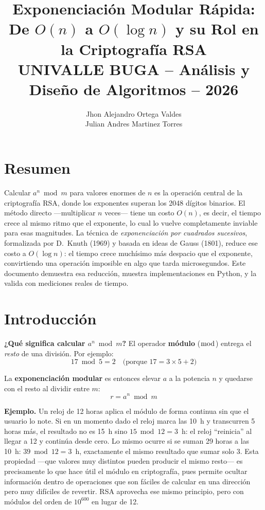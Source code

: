 \documentclass[twocolumn, 10pt]{article}
\title{\textbf{Exponenciación Modular Rápida:\\
De $O(n)$ a $O(\log n)$ y su Rol en la Criptografía RSA}\\[4pt]
\small UNIVALLE BUGA -- Análisis y Diseño de Algoritmos -- 2026}
\author{Jhon Alejandro Ortega Valdes\\ Julian Andres Martinez Torres}
\date{}
\begin{document}
\maketitle

\section*{Resumen}

Calcular $a^n \bmod m$ para valores enormes de $n$ es la operación central
de la criptografía RSA, donde los exponentes superan los 2048 dígitos
binarios. El método directo ---multiplicar $n$ veces--- tiene un costo
$O(n)$, es decir, el tiempo crece al mismo ritmo que el exponente, lo cual
lo vuelve completamente inviable para esas magnitudes. La técnica de
\emph{exponenciación por cuadrados sucesivos}, formalizada por D.\ Knuth
(1969) y basada en ideas de Gauss (1801), reduce ese costo a $O(\log n)$:
el tiempo crece muchísimo más despacio que el exponente, convirtiendo una
operación imposible en algo que tarda microsegundos. Este documento
demuestra esa reducción, muestra implementaciones en Python, y la
valida con mediciones reales de tiempo.

\section{Introducción}

\textbf{¿Qué significa calcular $a^n \bmod m$?} El operador
\textbf{módulo} ($\bmod$) entrega el \emph{resto} de una división. Por
ejemplo:
\[
  17 \bmod 5 = 2 \quad \text{(porque } 17 = 3 \times 5 + 2\text{)}
\]

La \textbf{exponenciación modular} es entonces elevar $a$ a la potencia
$n$ y quedarse con el resto al dividir entre $m$:
\[
  r = a^n \bmod m
\]

\textbf{Ejemplo.} Un reloj de 12 horas aplica el módulo de forma
continua sin que el usuario lo note. Si en un momento dado el reloj
marca las 10~h y transcurren 5 horas más, el resultado no es 15~h
sino $15 \bmod 12 = 3$~h: el reloj ``reinicia'' al llegar a 12 y
continúa desde cero. Lo mismo ocurre si se suman 29 horas a las 10~h:
$39 \bmod 12 = 3$~h, exactamente el mismo resultado que sumar solo 3.
Esta propiedad ---que valores muy distintos pueden producir el mismo
resto--- es precisamente lo que hace útil el módulo en criptografía,
pues permite ocultar información dentro de operaciones que son fáciles
de calcular en una dirección pero muy difíciles de revertir. RSA
aprovecha ese mismo principio, pero con módulos del orden de
$10^{600}$ en lugar de 12.
\end{document}
